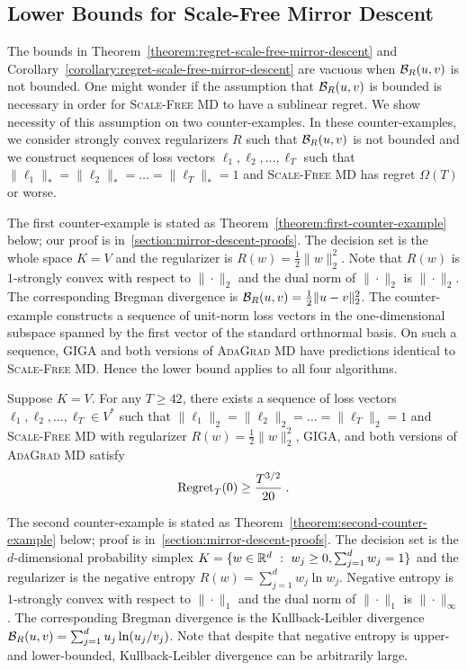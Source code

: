 \subsection{Lower Bounds for Scale-Free Mirror Descent}
\label{subsection:mirror-descent-lower-bound}

The bounds in Theorem~\ref{theorem:regret-scale-free-mirror-descent} and
Corollary~\ref{corollary:regret-scale-free-mirror-descent} are vacuous when
$\mathcal{B}_R(u,v)$ is not bounded. One might wonder if the assumption that
$\mathcal{B}_R(u,v)$ is bounded is necessary in order for \textsc{Scale-Free MD} to
have a sublinear regret. We show necessity of this assumption on two
counter-examples.  In these counter-examples, we consider strongly convex
regularizers $R$ such that $\mathcal{B}_R(u,v)$ is not bounded and we construct
sequences of loss vectors $\ell_1, \ell_2, \dots, \ell_T$ such that
$\|\ell_1\|_* = \|\ell_2\|_* = \dots = \|\ell_T\|_* = 1$ and \textsc{Scale-Free
MD} has regret $\Omega(T)$ or worse.

The first counter-example is stated as
Theorem~\ref{theorem:first-counter-example} below; our proof is
in~\ref{section:mirror-descent-proofs}. The decision set is the whole space
$K=V$ and the regularizer is $R(w) = \frac{1}{2}\|w\|_2^2$. Note that $R(w)$ is
$1$-strongly convex with respect to $\|\cdot\|_2$ and the dual norm of
$\|\cdot\|_2$ is $\|\cdot\|_2$. The corresponding Bregman divergence is
$\mathcal{B}_R(u,v) = \frac{1}{2}\|u-v\|_2^2$. The counter-example constructs a
sequence of unit-norm loss vectors in the one-dimensional subspace spanned by
the first vector of the standard orthnormal basis.  On such a sequence,
\textsc{GIGA} and both versions of \textsc{AdaGrad MD} have predictions
identical to \textsc{Scale-Free MD}. Hence the lower bound applies to all four
algorithms.

\begin{theorem}
\label{theorem:first-counter-example}
Suppose $K = V$. For any $T \ge 42$, there exists a sequence of loss vectors
$\ell_1, \ell_2, \dots, \ell_T \in V^*$ such that $\|\ell_1\|_2 = \|\ell_2\|_2
= \dots = \|\ell_T\|_2 = 1$ and \textsc{Scale-Free MD} with
regularizer $R(w) = \frac{1}{2}\|w\|_2^2$, \textsc{GIGA},
and both versions of \textsc{AdaGrad MD} satisfy
$$
\operatorname{Regret}_T(0) \ge \frac{T^{3/2}}{20} \; .
$$
\end{theorem}

The second counter-example is stated as
Theorem~\ref{theorem:second-counter-example} below; proof is
in~\ref{section:mirror-descent-proofs}.  The decision set is the
$d$-dimensional probability simplex $K = \{ w \in \mathbb{R}^d ~:~ w_j \ge 0,
\sum_{j=1}^d w_j = 1 \}$ and the regularizer is the negative entropy $R(w) =
\sum_{j=1}^d w_j \ln w_j$.  Negative entropy is $1$-strongly convex with
respect to $\|\cdot\|_1$ and the dual norm of $\|\cdot\|_1$ is
\mbox{$\|\cdot\|_\infty$}.  The corresponding Bregman divergence is the
Kullback-Leibler divergence $\mathcal{B}_R(u,v) = \sum_{j=1}^d u_j \ln(u_j/v_j)$.
Note that despite that negative entropy is upper- and lower-bounded,
Kullback-Leibler divergence can be arbitrarily large.

